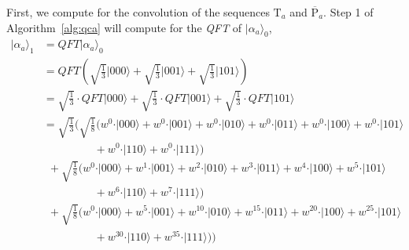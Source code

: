 \begin{example}
First, we compute for the convolution of the sequences $\text{T}_a$ and $\overline{\text{P}}_a$. Step 1 of Algorithm~\ref{alg:qca} will compute for the \textit{QFT} of $\vert \alpha_{a} \rangle_0$,
	\begin{align*}
		\vert \alpha_{a} \rangle_1 &= QFT\vert \alpha_{a} \rangle_0 \\
		&= QFT\left( \sqrt{\frac{1}{3}}\vert 000 \rangle + \sqrt{\frac{1}{3}}\vert 001 \rangle + \sqrt{\frac{1}{3}}\vert 101 \rangle \right)\\
		&= \sqrt{\frac{1}{3}} \cdot QFT\vert 000 \rangle + \sqrt{\frac{1}{3}} \cdot QFT\vert 001 \rangle + \sqrt{\frac{1}{3}} \cdot QFT\vert 101 \rangle \\
		&= \sqrt{\frac{1}{3}} \bigg( \sqrt{\frac{1}{8}} \Big(  w^{0} \cdot \vert 000 \rangle +  w^{0} \cdot \vert 001 \rangle +  w^{0} \cdot \vert 010 \rangle +  w^{0} \cdot \vert 011 \rangle +  w^{0} \cdot \vert 100 \rangle +  w^{0} \cdot \vert 101 \rangle \\
		&\ \ \ \ \ \ \ \ \ \ \ \ \ \ \ \ \ \ \ \ \ +  w^{0} \cdot \vert 110 \rangle +  w^{0} \cdot \vert 111 \rangle \Big) \\
		&\ \ + \sqrt{\frac{1}{8}} \Big( w^{0} \cdot \vert 000 \rangle + w^{1} \cdot \vert 001 \rangle + w^{2} \cdot \vert 010 \rangle + w^{3} \cdot \vert 011 \rangle + w^{4} \cdot \vert 100 \rangle + w^{5} \cdot \vert 101 \rangle\\
		&\ \ \ \ \ \ \ \ \ \ \ \ \ \ \ \ \ \ \ \ \ + w^{6} \cdot \vert 110 \rangle + w^{7} \cdot \vert 111 \rangle \Big)\\
		&\ \ + \sqrt{\frac{1}{8}} \Big( w^{0} \cdot \vert 000 \rangle + w^{5} \cdot \vert 001 \rangle + w^{10} \cdot \vert 010 \rangle + w^{15} \cdot \vert 011 \rangle + w^{20} \cdot \vert 100 \rangle + w^{25} \cdot \vert 101 \rangle\\
		&\ \ \ \ \ \ \ \ \ \ \ \ \ \ \ \ \ \ \ \ \ + w^{30} \cdot \vert 110 \rangle + w^{35} \cdot \vert 111 \rangle \Big)  \bigg)\\

\end{align*}
\end{example}
